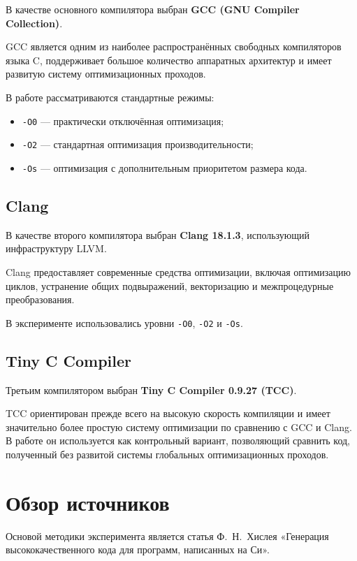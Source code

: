 \documentclass[12pt,a4paper]{article}
\begin{document}
В качестве основного компилятора выбран \textbf{GCC (GNU Compiler Collection)}.

GCC является одним из наиболее распространённых свободных компиляторов языка C, поддерживает большое количество аппаратных архитектур и имеет развитую систему оптимизационных проходов.

В работе рассматриваются стандартные режимы:
\begin{itemize}
    \item \texttt{-O0} --- практически отключённая оптимизация;
    \item \texttt{-O2} --- стандартная оптимизация производительности;
    \item \texttt{-Os} --- оптимизация с дополнительным приоритетом размера кода.
\end{itemize}

\subsection{Clang}

В качестве второго компилятора выбран \textbf{Clang 18.1.3}, использующий инфраструктуру LLVM.

Clang предоставляет современные средства оптимизации, включая оптимизацию циклов, устранение общих подвыражений, векторизацию и межпроцедурные преобразования.

В эксперименте использовались уровни \texttt{-O0}, \texttt{-O2} и \texttt{-Os}.

\subsection{Tiny C Compiler}

Третьим компилятором выбран \textbf{Tiny C Compiler 0.9.27 (TCC)}.

TCC ориентирован прежде всего на высокую скорость компиляции и имеет значительно более простую систему оптимизации по сравнению с GCC и Clang. В работе он используется как контрольный вариант, позволяющий сравнить код, полученный без развитой системы глобальных оптимизационных проходов.

\section{Обзор источников}

Основой методики эксперимента является статья Ф.~Н.~Хислея «Генерация высококачественного кода для программ, написанных на Си».
\end{document}
